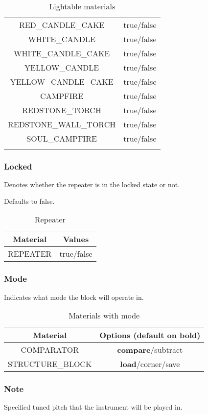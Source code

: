 \begin{longtable}{ |c|c| }
	RED\_CANDLE\_CAKE & true/false \\
	WHITE\_CANDLE & true/false \\
	WHITE\_CANDLE\_CAKE & true/false \\
	YELLOW\_CANDLE & true/false \\
	YELLOW\_CANDLE\_CAKE & true/false \\
	\hline
	CAMPFIRE & true/false \\
	REDSTONE\_TORCH & true/false \\
	REDSTONE\_WALL\_TORCH & true/false \\
	SOUL\_CAMPFIRE & true/false \\
	\hline
	\caption{Lightable materials}
\end{longtable}


\subsubsection{Locked}\label{spigot-types:locked}
Denotes whether the repeater is in the locked state or not.

Defaults to false.

\begin{table}[H]
	\centering
	\begin{tabular}{ |c|c| }
		\hline
		Material & Values \\
		\hline
		REPEATER & true/false \\
		\hline
	\end{tabular}
	\caption{Repeater}
\end{table}

\subsubsection{Mode}\label{spigot-types:mode}
Indicates what mode the block will operate in.

\begin{table}[H]
	\centering
	\begin{tabular}{ |c|c| }
		\hline
		Material & Options (default on bold) \\
		\hline
		COMPARATOR & \textbf{compare}/subtract \\
		STRUCTURE\_BLOCK & \textbf{load}/corner/save \\
		\hline
	\end{tabular}
	\caption{Materials with mode}
\end{table}

\subsubsection{Note}\label{spigot-types:note}
Specified tuned pitch that the instrument will be played in.

